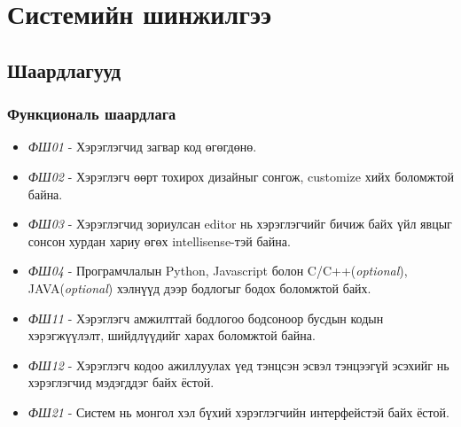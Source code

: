 \chapter{Системийн шинжилгээ}
\section{Шаардлагууд}

\subsection{Функциональ шаардлага}
\begin{itemize}
  \item \textit{ФШ01} - Хэрэглэгчид загвар код өгөгдөнө.
  \item \textit{ФШ02} - Хэрэглэгч өөрт тохирох дизайныг сонгож, customize хийх боломжтой байна.
  \item \textit{ФШ03} - Хэрэглэгчид зориулсан editor нь хэрэглэгчийг бичиж байх үйл явцыг сонсон хурдан хариу өгөх intellisense-тэй байна.
  \item \textit{ФШ04} - Програмчлалын Python, Javascript болон C/C++(\textit{optional}), JAVA(\textit{optional}) хэлнүүд дээр бодлогыг бодох боломжтой байх.
  \item \textit{ФШ11} - Хэрэглэгч амжилттай бодлогоо бодсоноор бусдын кодын хэрэгжүүлэлт, шийдлүүдийг харах боломжтой байна.
  \item \textit{ФШ12} - Хэрэглэгч кодоо ажиллуулах үед тэнцсэн эсвэл тэнцээгүй эсэхийг нь хэрэглэгчид мэдэгддэг байх ёстой.
  \item \textit{ФШ21} - Систем нь монгол хэл бүхий хэрэглэгчийн интерфейстэй байх ёстой.
\end{itemize}

